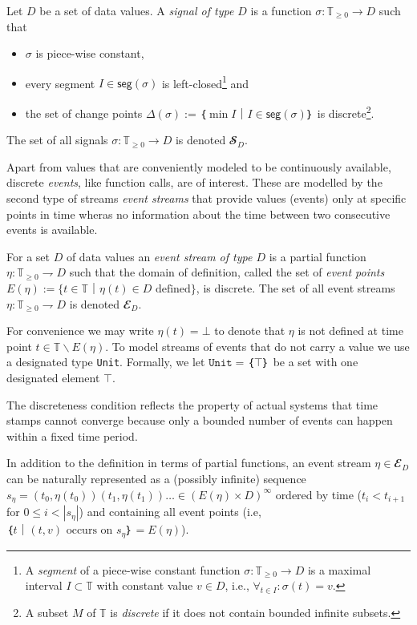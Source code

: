 \begin{definition}[Signals]
  Let $D$ be a set of data values.
  A \emph{signal of type $D$} is a function $σ: 𝕋_{≥0} → D$ such that
  \begin{itemize}
    \item $σ$ is piece-wise constant,
    \item every segment $I∈\mathsf{seg}(σ)$ is left-closed\footnote{
          A \emph{segment} of a piece-wise constant function $σ: 𝕋_{≥0} → D$ is a maximal interval $I⊂𝕋$ with constant value $v∈D$, i.e., $∀_{t∈I}:σ(t)=v$.} and
    \item the set of change points $Δ(σ) := ｛\min I｜I∈\mathsf{seg}(σ)｝$ is discrete\footnote{A subset $M$ of $𝕋$ is \emph{discrete} if it does not contain bounded infinite subsets.}.
  \end{itemize}
  The set of all signals $σ: 𝕋_{≥0} → D$ is denoted $𝓢_D$.
\end{definition}

Apart from values that are conveniently modeled to be continuously available, discrete \emph{events}, like function calls, are of interest.
These are modelled by the second type of streams \emph{event streams} that provide values (events) only at specific points in time wheras no information about the time between two consecutive events is available.

\begin{definition}
  For a set $D$ of data values an \emph{event stream of type $D$} is a partial function $η: 𝕋_{≥0} ⇁ D$ such that the domain of definition, called the set of \emph{event points} $E(η) := \{t∈𝕋｜η(t)∈D \text{ defined}\}$, is discrete.
%
  The set of all event streams $η: 𝕋_{≥0} ⇁D$ is denoted $𝓔_D$.
\end{definition}

For convenience we may write $η(t) = ⊥$ to denote that $η$ is not defined at time point $t∈𝕋∖ E(η)$.
To model streams of events that do not carry a value we use a designated type \texttt{Unit}.
Formally, we let $\mathtt{Unit}=｛⊤｝$ be a set with one designated element $⊤$.

The discreteness condition reflects the property of actual systems that time stamps cannot converge because only a bounded number of events can happen within a fixed time period.

In addition to the definition in terms of partial functions, an event stream $η∈𝓔_D$ can be naturally represented as a (possibly infinite) sequence $s_η=(t_0,η(t_0))(t_1,η(t_1))…∈(E(η)×D)^∞$ ordered by time ($t_i<t_{i+1}$ for $0≤i<|s_η|$) and containing all event points (i.e, $｛t｜(t,v) \text{ occurs on } s_η｝= E(η)$).

